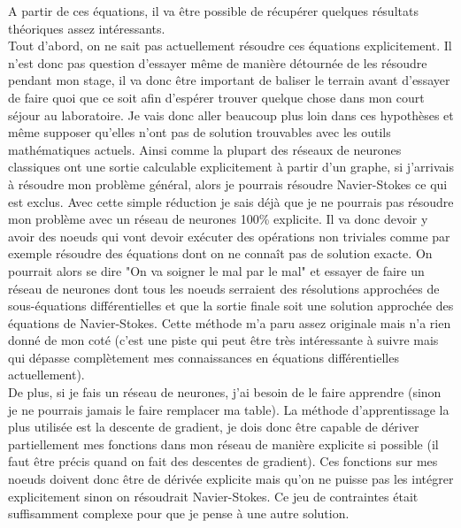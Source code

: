 \documentclass[10pt]{article}
\begin{document}
A partir de ces équations, il va être possible de récupérer quelques résultats théoriques assez intéressants.\\ 
Tout d'abord, on ne sait pas actuellement résoudre ces équations explicitement. Il n'est donc pas question d'essayer même de manière détournée de les résoudre pendant mon stage, il va donc être important de baliser le terrain avant d'essayer de faire quoi que ce soit afin d'espérer trouver quelque chose dans mon court séjour au laboratoire. Je vais donc aller beaucoup plus loin dans ces hypothèses et même supposer qu'elles n'ont pas de solution trouvables avec les outils mathématiques actuels. Ainsi comme la plupart des réseaux de neurones classiques ont une sortie calculable explicitement à partir d'un graphe, si j'arrivais à résoudre mon problème général, alors je pourrais résoudre Navier-Stokes ce qui est exclus. Avec cette simple réduction je sais déjà que je ne pourrais pas résoudre mon problème avec un réseau de neurones 100\% explicite. Il va donc devoir y avoir des noeuds qui vont devoir exécuter des opérations non triviales comme par exemple résoudre des équations dont on ne connaît pas de solution exacte. On pourrait alors se dire "On va soigner le mal par le mal" et essayer de faire un réseau de neurones dont tous les noeuds serraient des résolutions approchées de sous-équations différentielles et que la sortie finale soit une solution approchée des équations de Navier-Stokes. Cette méthode m'a paru assez originale mais n'a rien donné de mon coté (c'est une piste qui peut être très intéressante à suivre mais qui dépasse complètement mes connaissances en équations différentielles actuellement). \\
De plus, si je fais un réseau de neurones, j'ai besoin de le faire apprendre (sinon je ne pourrais jamais le faire remplacer ma table). La méthode d'apprentissage la plus utilisée est la descente de gradient, je dois donc être capable de dériver partiellement mes fonctions dans mon réseau de manière explicite si possible (il faut être précis quand on fait des descentes de gradient). Ces fonctions sur mes noeuds doivent donc être de dérivée explicite mais qu'on ne puisse pas les intégrer explicitement sinon on résoudrait Navier-Stokes. Ce jeu de contraintes était suffisamment complexe pour que je pense à une autre solution.
\end{document}
